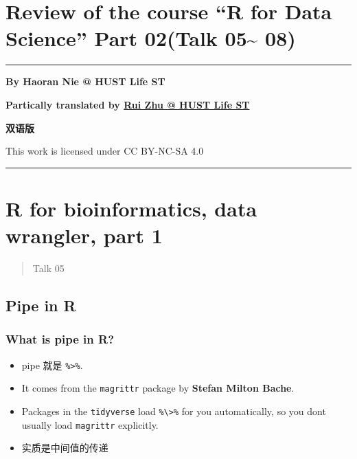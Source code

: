 \documentclass[
]{article}
\author{}
\date{}
\begin{document}
\hypertarget{review-of-the-course-r-for-data-science-part-02talk-05-08}{%
\section{Review of the course ``R for Data Science'' Part 02(Talk
05\textasciitilde{}
08)}\label{review-of-the-course-r-for-data-science-part-02talk-05-08}}

\begin{center}\rule{0.5\linewidth}{0.5pt}\end{center}

\textbf{By Haoran Nie @ HUST Life ST}

\textbf{Partically translated by
\href{https://github.com/1508324011}{Rui Zhu @ HUST Life ST}}

\textbf{双语版}

This work is licensed under CC BY-NC-SA 4.0

\begin{center}\rule{0.5\linewidth}{0.5pt}\end{center}

\tableofcontents

\newpage
\setcounter{page}{1}  %
\hypertarget{r-for-bioinformatics-data-wrangler-part-1}{%
\section{R for bioinformatics, data wrangler, part
1}\label{r-for-bioinformatics-data-wrangler-part-1}}

\begin{quote}
Talk 05
\end{quote}

\hypertarget{pipe-in-r}{%
\subsection{Pipe in R}\label{pipe-in-r}}

\hypertarget{what-is-pipe-in-r}{%
\subsubsection{What is pipe in R?}\label{what-is-pipe-in-r}}

\begin{itemize}
\item
  pipe 就是 \texttt{\%\textgreater{}\%}.
\item
  It comes from the \texttt{magrittr} package by \textbf{Stefan Milton
  Bache}.
\item
  Packages in the \texttt{tidyverse} load
  \texttt{\%\textbackslash{}\textgreater{}\%} for you automatically, so
  you don\textquotesingle t usually load \texttt{magrittr} explicitly.
\item
  实质是中间值的传递
\end{itemize}
\end{document}
